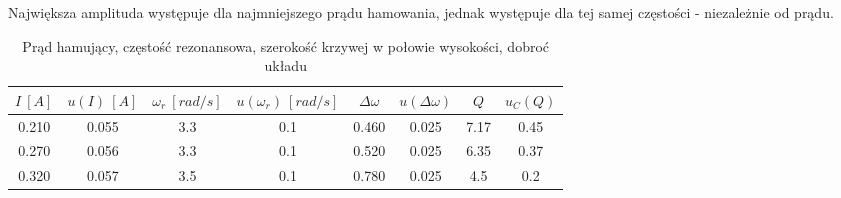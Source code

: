 \documentclass[12pt, a4paper, oneside]{article}
\begin{document}
Największa amplituda występuje dla najmniejszego prądu hamowania, jednak występuje dla tej samej częstości - niezależnie od prądu.
\begin{table}[h]
  \centering
  \caption{Prąd hamujący, częstość rezonansowa, szerokość krzywej w połowie wysokości, dobroć układu}
    \begin{tabular}{|c|c|c|c|c|c|c|c|}\hline
    $I~[A]$&$u(I)~[A]$&$\omega_r~[rad/s]$ & $u(\omega_r)~[rad/s]$ & $\Delta\omega$ & $u(\Delta\omega)$ & $Q$ & $u_C(Q)$ \\\hline
    0.210&0.055&3.3 & 0.1 & 0.460 & 0.025 & 7.17 & 0.45 \\\hline
    0.270&0.056&3.3 & 0.1 & 0.520 & 0.025 & 6.35 & 0.37 \\\hline
    0.320&0.057&3.5 & 0.1 & 0.780 & 0.025 & 4.5 & 0.2 \\\hline
    \end{tabular}%
  \label{tab:addlabel}%
\end{table}%
\end{document}

